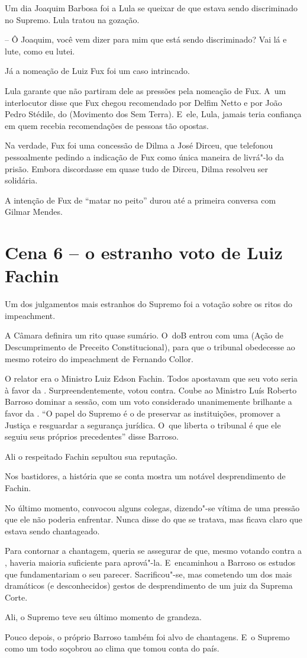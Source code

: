 Um dia Joaquim Barbosa foi a Lula se queixar de que estava sendo
discriminado no Supremo. Lula tratou na gozação.

-- Ô Joaquim, você vem dizer para mim que está sendo discriminado? Vai
lá e lute, como eu lutei.

Já a nomeação de Luiz Fux foi um caso intrincado.

Lula garante que não partiram dele as pressões pela nomeação de Fux. A~um interlocutor disse que Fux chegou recomendado por Delfim Netto e por
João Pedro Stédile, do  (Movimento dos Sem Terra). E~ele, Lula,
jamais teria confiança em quem recebia recomendações de pessoas tão
opostas.

Na verdade, Fux foi uma concessão de Dilma a José Dirceu, que telefonou
pessoalmente pedindo a indicação de Fux como única maneira de livrá"-lo
da prisão. Embora discordasse em quase tudo de Dirceu, Dilma resolveu
ser solidária.

A intenção de Fux de ``matar no peito'' durou até a primeira conversa
com Gilmar Mendes.

\section{Cena 6 -- o estranho voto de Luiz Fachin}

Um dos julgamentos mais estranhos do Supremo foi a votação sobre os
ritos do impeachment.

A Câmara definira um rito quase sumário. O~doB entrou com uma 
(Ação de Descumprimento de Preceito Constitucional), para que o tribunal
obedecesse ao mesmo roteiro do impeachment de Fernando Collor.

O relator era o Ministro Luiz Edson Fachin. Todos apostavam que seu voto
seria à favor da . Surpreendentemente, votou contra. Coube ao
Ministro Luís Roberto Barroso dominar a sessão, com um voto considerado
unanimemente brilhante a favor da . ``O papel do Supremo é o de
preservar as instituições, promover a Justiça e resguardar a segurança
jurídica. O~que liberta o tribunal é que ele seguiu seus próprios
precedentes'' disse Barroso.

Ali o respeitado Fachin sepultou sua reputação.

Nos bastidores, a história que se conta mostra um notável desprendimento
de Fachin.

No último momento, convocou alguns colegas, dizendo"-se vítima de uma
pressão que ele não poderia enfrentar. Nunca disse do que se tratava,
mas ficava claro que estava sendo chantageado.

Para contornar a chantagem, queria se assegurar de que, mesmo votando
contra a , haveria maioria suficiente para aprová"-la. E~encaminhou a
Barroso os estudos que fundamentariam o seu parecer. Sacrificou"-se, mas
cometendo um dos mais dramáticos (e desconhecidos) gestos de
desprendimento de um juiz da Suprema Corte.

Ali, o Supremo teve seu último momento de grandeza.

Pouco depois, o próprio Barroso também foi alvo de chantagens. E~o
Supremo como um todo soçobrou ao clima que tomou conta do país.
